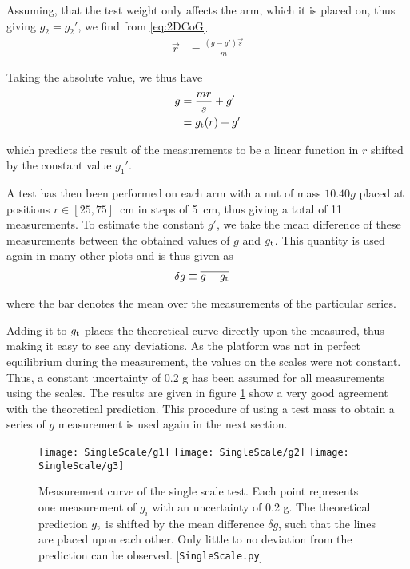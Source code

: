 \documentclass[journal]{IEEEtran}
\begin{document}
Assuming, that the test weight only affects the arm, which it is placed on, thus giving $g_2 = g_2'$, we find from \eqref{eq:2DCoG}
\begin{align}
	\vec{r} & = \frac{(g - g') \vec{s}}{m}
\end{align}

Taking the absolute value, we thus have
\begin{align}
	g & = \frac{m r}{s} + g'\\
	& = g_{\textup{t}}(r) + g'
	\label{eq:gt}
\end{align}

which predicts the result of the measurements to be a linear function in $r$ shifted by the constant value $g_1'$.

A test has then been performed on each arm with a nut of mass $10.40 \unit{g}$ placed at positions $r \in [25, 75]$~cm in steps of 5~cm, thus giving a total of 11 measurements.
To estimate the constant $g'$, we take the mean difference of these measurements between the obtained values of $g$ and $g_{\textup{t}}$.
This quantity is used again in many other plots and is thus given as
\begin{align}
	\delta g & \equiv \overline{g - g_{\textup{t}}}
	\label{eq:DeltaG}
\end{align}

where the bar denotes the mean over the measurements of the particular series.

Adding it to $g_{\textup{t}}$ places the theoretical curve directly upon the measured, thus making it easy to see any deviations.
As the platform was not in perfect equilibrium during the measurement, the values on the scales were not constant. Thus, a constant uncertainty of 0.2 g has been assumed for all measurements using the scales.
The results are given in figure \ref{fig:SingleScale} show a very good agreement with the theoretical prediction.
This procedure of using a test mass to obtain a series of $g$ measurement is used again in the next section.

\begin{figure}
	\centering
	\texttt{[image: SingleScale/g1]}
	\texttt{[image: SingleScale/g2]}
	\texttt{[image: SingleScale/g3]}
	\caption{Measurement curve of the single scale test. Each point represents one measurement of $g_i$ with an uncertainty of 0.2 g. The theoretical prediction $g_{\textup{t}}$ is shifted by the mean difference $\delta g$, such that the lines are placed upon each other. Only little to no deviation from the prediction can be observed. [\texttt{SingleScale.py}]}
	\label{fig:SingleScale}
\end{figure}
\end{document}

